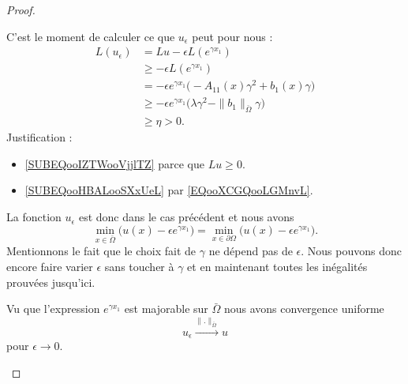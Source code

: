 \begin{proof}
\begin{subproof}
            C'est le moment de calculer ce que \( u_{\epsilon}\) peut pour nous :
            \begin{subequations}
                \begin{align}
                    L(u_{\epsilon})&=Lu-\epsilon L( e^{\gamma x_1})\\
                    &\geq -\epsilon L( e^{\gamma x_1})       \label{SUBEQooIZTWooVjjlTZ}\\
                    &=-\epsilon e^{\gamma x_1}\big( -A_{11}(x)\gamma^2+b_1(x)\gamma \big)\\
                    &\geq -\epsilon e^{\gamma x_1}\big( \lambda\gamma^2-\| b_1 \|_{\bar\Omega}\gamma \big)  \label{SUBEQooHBALooSXxUeL}\\
                    &\geq \eta>0.
                \end{align}
            \end{subequations}
            Justification :
            \begin{itemize}
                \item \eqref{SUBEQooIZTWooVjjlTZ} parce que \( Lu\geq 0\).
                \item \eqref{SUBEQooHBALooSXxUeL} par \eqref{EQooXCGQooLGMnvL}.
            \end{itemize}

            La fonction \( u_{\epsilon}\) est donc dans le cas précédent et nous avons
            \begin{equation}
                \min_{x\in\bar \Omega}\big( u(x)-\epsilon e^{\gamma x_1} \big)=\min_{x\in\partial \Omega}\big( u(x)-\epsilon e^{\gamma x_1} \big).
            \end{equation}
            Mentionnons le fait que le choix fait de \( \gamma\) ne dépend pas de \( \epsilon\). Nous pouvons donc encore faire varier \( \epsilon\) sans toucher à \( \gamma\) et en maintenant toutes les inégalités prouvées jusqu'ici.

            Vu que l'expression \(  e^{\gamma x_1}\) est majorable sur \( \bar \Omega\) nous avons convergence uniforme
            \begin{equation}
                u_{\epsilon} \stackrel{\| . \|_{\bar\Omega}}{\longrightarrow}u
            \end{equation}
            pour \( \epsilon\to 0\).


\end{subproof}
\end{proof}
